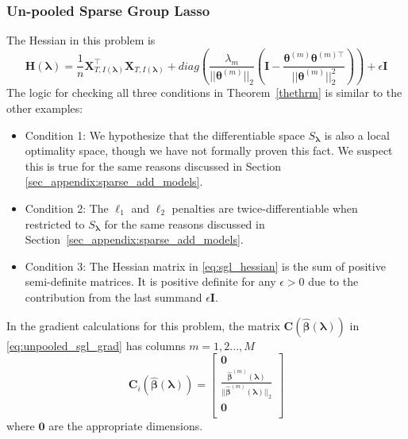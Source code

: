 \documentclass[12pt,letterpaper]{article}
\begin{document}
\subsubsection{Un-pooled Sparse Group Lasso}
The Hessian in this problem is
\begin{equation}
\boldsymbol{H}(\boldsymbol\lambda) =
\frac{1}{n} \boldsymbol X_{T, I(\boldsymbol \lambda)}^\top \boldsymbol X_{T, I(\boldsymbol \lambda)}
+ diag\left(
\frac{\lambda_m}{|| \boldsymbol \theta^{(m)}||_2}
\left (
\boldsymbol I - 
\frac{\boldsymbol \theta^{(m)} \boldsymbol \theta^{(m) \top}}{|| \boldsymbol \theta^{(m)}||_2^2}
\right )
\right)
+ \epsilon \boldsymbol I
\label{eq:sgl_hessian}
\end{equation}
The logic for checking all three conditions in Theorem~\ref{thethrm} is similar to the other examples:
\begin{itemize}
	\item[] Condition 1: We hypothesize that the differentiable space $S_{\boldsymbol{\lambda}}$ is also a local optimality space, though we have not formally proven this fact. We suspect this is true for the same reasons discussed in Section \ref{sec_appendix:sparse_add_models}.
	\item[] Condition 2: The $\ell_1$ and $\ell_2$ penalties are twice-differentiable when restricted to $S_{\boldsymbol{\lambda}}$ for the same reasons discussed in Section~\ref{sec_appendix:sparse_add_models}. \hfill {}
	\item[] Condition 3: The Hessian matrix in \eqref{eq:sgl_hessian} is the sum of positive semi-definite matrices. It is positive definite for any $\epsilon > 0$ due to the contribution from the last summand $\epsilon \boldsymbol{I}$. \hfill {}
\end{itemize}

In the gradient calculations for this problem, the matrix $\boldsymbol C(\hat {\boldsymbol \beta}(\boldsymbol \lambda))$ in \eqref{eq:unpooled_sgl_grad} has columns $m=1,2...,M$ 
\begin{equation}
\boldsymbol{C}_i(\hat{\boldsymbol \beta}( \boldsymbol \lambda))
=
\begin{bmatrix}
\boldsymbol 0\\
\frac{\hat {\boldsymbol \beta}^{(m)}(\boldsymbol \lambda)}{||\hat{\boldsymbol \beta}^{(m)}(\boldsymbol \lambda)||_2}\\
\boldsymbol 0\\
\end{bmatrix}
\end{equation}
where $\boldsymbol 0$ are the appropriate dimensions.
\end{document}
